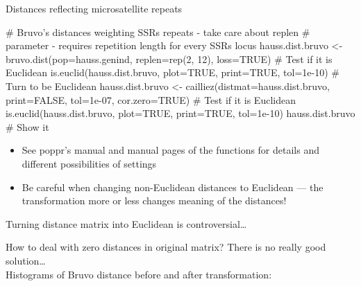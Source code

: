 \documentclass[compress, ucs, xelatex, 11pt, xcolor=svgnames, aspectratio=169,
	hyperref={
		bookmarks=true,
		unicode=true,
		colorlinks=true,
		pdftitle={Molecular data in R},
		plainpages=false,
		pdfauthor={Vojtech Zeisek},
		pdfsubject={Course about phylogeny and evolution in R},
		pdfcreator={XeLaTeX},
		pdfkeywords={R, evolution, phylogeny, molecular data},
		linkcolor=Crimson, %
		anchorcolor=Magenta, %
		citecolor=Magenta, %
		filecolor=Magenta, %
		menucolor=Magenta, %
		urlcolor=DodgerBlue, %
		pdftex},
	url={hyphens, lowtilde} %
	]{beamer}
\renewcommand{\texttt}[1]{\colorbox{Beige}{{\ttfamily #1}}}
\begin{document}
\begin{frame}[fragile]{Distances reflecting microsatellite repeats}
	\begin{spluscode}
    # Bruvo's distances weighting SSRs repeats - take care about replen
    # parameter - requires repetition length for every SSRs locus
    hauss.dist.bruvo <- bruvo.dist(pop=hauss.genind, replen=rep(2, 12),
      loss=TRUE)
    # Test if it is Euclidean
    is.euclid(hauss.dist.bruvo, plot=TRUE, print=TRUE, tol=1e-10)
    # Turn to be Euclidean
    hauss.dist.bruvo <- cailliez(distmat=hauss.dist.bruvo, print=FALSE,
      tol=1e-07, cor.zero=TRUE)
    # Test if it is Euclidean
    is.euclid(hauss.dist.bruvo, plot=TRUE, print=TRUE, tol=1e-10)
    hauss.dist.bruvo  # Show it
	\end{spluscode}
	\begin{itemize}
		\item See poppr's manual and manual pages of the functions for details and different possibilities of settings
		\item Be careful when changing non-Euclidean distances to Euclidean --- \alert{the transformation more or less changes meaning of the distances!}
	\end{itemize}
\end{frame}

\begin{frame}{Turning distance matrix into Euclidean is controversial\ldots}
	\begin{footnotesize}
		How to deal with zero distances in original matrix? There is no really good solution\ldots\\ Histograms of Bruvo distance before and after transformation:
	\end{footnotesize}
	\begin{center}
		\texttt{[image: bruvodist.png]}
	\end{center}
\end{frame}
\end{document}
